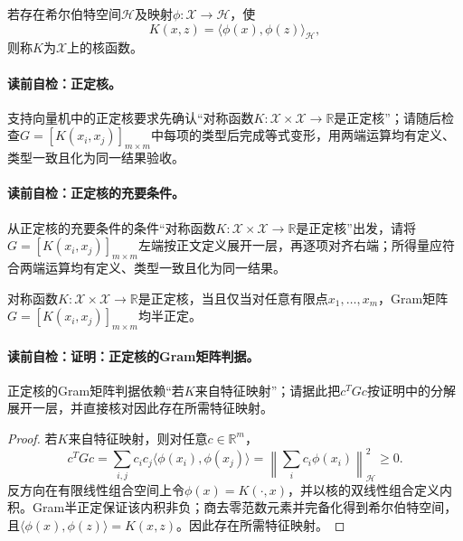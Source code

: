 \begin{definition}[核函数]\label{def:V3-C02-kernel}
若存在希尔伯特空间$\mathcal H$及映射$\phi:\mathcal X\to\mathcal H$，使
\[
K(x,z)=\langle\phi(x),\phi(z)\rangle_{\mathcal H},
\]
则称$K$为$\mathcal X$上的核函数。
\end{definition}

\paragraph{读前自检：正定核。}支持向量机中的正定核要求先确认“对称函数$K:\mathcal X\times\mathcal X\to\mathbb R$是正定核”；请随后检查$G=[K(x_i,x_j)]_{m\times m}$中每项的类型后完成等式变形，用两端运算均有定义、类型一致且化为同一结果验收。\par
\paragraph{读前自检：正定核的充要条件。}从正定核的充要条件的条件“对称函数$K:\mathcal X\times\mathcal X\to\mathbb R$是正定核”出发，请将$G=[K(x_i,x_j)]_{m\times m}$左端按正文定义展开一层，再逐项对齐右端；所得量应符合两端运算均有定义、类型一致且化为同一结果。\par

\begin{theorem}[正定核的Gram矩阵判据]\label{thm:V3-C02-kernel-psd}
对称函数$K:\mathcal X\times\mathcal X\to\mathbb R$是正定核，当且仅当对任意有限点$x_1,\ldots,x_m$，Gram矩阵$G=[K(x_i,x_j)]_{m\times m}$均半正定。
\end{theorem}
\paragraph{读前自检：证明：正定核的Gram矩阵判据。}正定核的Gram矩阵判据依赖“若$K$来自特征映射”；请据此把$c^TGc$按证明中的分解展开一层，并直接核对因此存在所需特征映射。\par

\begin{proof}
若$K$来自特征映射，则对任意$c\in\mathbb R^m$，
\[
c^TGc=\sum_{i,j}c_ic_j\langle\phi(x_i),\phi(x_j)\rangle
=\left\|\sum_ic_i\phi(x_i)\right\|_{\mathcal H}^2\geq0.
\]
反方向在有限线性组合空间上令$\phi(x)=K(\cdot,x)$，并以核的双线性组合定义内积。Gram半正定保证该内积非负；商去零范数元素并完备化得到希尔伯特空间，且$\langle\phi(x),\phi(z)\rangle=K(x,z)$。因此存在所需特征映射。
\end{proof}

